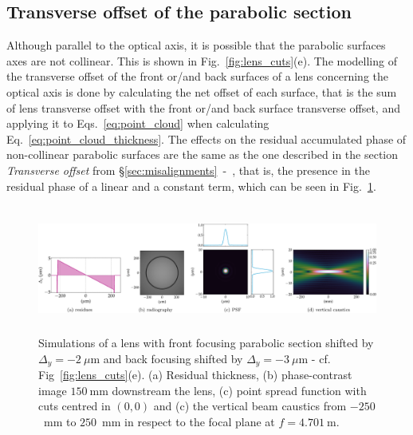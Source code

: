 \begin{refsection}
\subsection{Transverse offset of the parabolic section}

Although parallel to the optical axis, it is possible that the parabolic surfaces axes are not collinear. This is shown in Fig.~\ref{fig:lens_cuts}(e). The modelling of the transverse offset of the front or/and back surfaces of a lens concerning the optical axis is done by calculating the net offset of each surface, that is the sum of lens transverse offset with the front or/and back surface transverse offset, and applying it to Eqs.~\ref{eq:point_cloud} when calculating Eq.~\ref{eq:point_cloud_thickness}. The effects on the residual accumulated phase of non-collinear parabolic surfaces are the same as the one described in the section \textit{Transverse offset} from \S\ref{sec:misalignments}~-~\textit{}, that is, the presence in the residual phase of a linear and a constant term, which can be seen in Fig.~\ref{fig:offset_fs_CRL}.


\begin{figure}[t]
        \centering
        \includegraphics[height=4.19cm]{figures/ch04/offset_fs_CRL.pdf}
        \caption[Effects of the transverse offset of the parabolic section]{Simulations of a lens with front focusing parabolic section shifted by $\Delta_y=-2~\mu$m and back focusing shifted by $\Delta_y=-3~\mu$m - cf. Fig~\ref{fig:lens_cuts}(e). (a) Residual thickness, (b) phase-contrast image $150~$mm downstream the lens, (c) point spread function with cuts centred in $(0,0)$ and (c) the vertical beam caustics from $-250$~mm to $250$~mm in respect to the focal plane at $f=4.701~$m.} \label{fig:offset_fs_CRL}
\end{figure}


\end{refsection}
